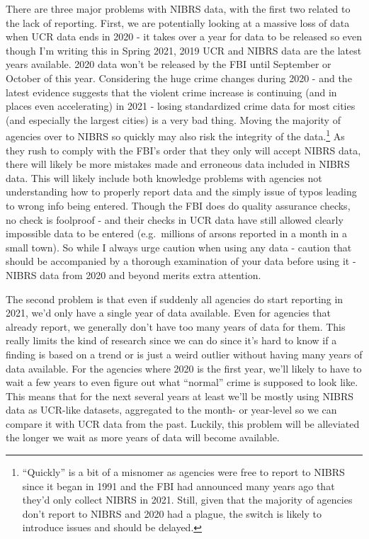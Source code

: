 \documentclass[
  12pt,
  openany]{book}
\begin{document}
There are three major problems with NIBRS data, with the first two related to the lack of reporting. First, we are potentially looking at a massive loss of data when UCR data ends in 2020 - it takes over a year for data to be released so even though I'm writing this in Spring 2021, 2019 UCR and NIBRS data are the latest years available. 2020 data won't be released by the FBI until September or October of this year. Considering the huge crime changes during 2020 - and the latest evidence suggests that the violent crime increase is continuing (and in places even accelerating) in 2021 - losing standardized crime data for most cities (and especially the largest cities) is a very bad thing. Moving the majority of agencies over to NIBRS so quickly may also risk the integrity of the data.\footnote{``Quickly'' is a bit of a misnomer as agencies were free to report to NIBRS since it began in 1991 and the FBI had announced many years ago that they'd only collect NIBRS in 2021. Still, given that the majority of agencies don't report to NIBRS and 2020 had a plague, the switch is likely to introduce issues and should be delayed.} As they rush to comply with the FBI's order that they only will accept NIBRS data, there will likely be more mistakes made and erroneous data included in NIBRS data. This will likely include both knowledge problems with agencies not understanding how to properly report data and the simply issue of typos leading to wrong info being entered. Though the FBI does do quality assurance checks, no check is foolproof - and their checks in UCR data have still allowed clearly impossible data to be entered (e.g.~millions of arsons reported in a month in a small town). So while I always urge caution when using any data - caution that should be accompanied by a thorough examination of your data before using it - NIBRS data from 2020 and beyond merits extra attention.

The second problem is that even if suddenly all agencies do start reporting in 2021, we'd only have a single year of data available. Even for agencies that already report, we generally don't have too many years of data for them. This really limits the kind of research since we can do since it's hard to know if a finding is based on a trend or is just a weird outlier without having many years of data available. For the agencies where 2020 is the first year, we'll likely to have to wait a few years to even figure out what ``normal'' crime is supposed to look like. This means that for the next several years at least we'll be mostly using NIBRS data as UCR-like datasets, aggregated to the month- or year-level so we can compare it with UCR data from the past. Luckily, this problem will be alleviated the longer we wait as more years of data will become available.
\end{document}
